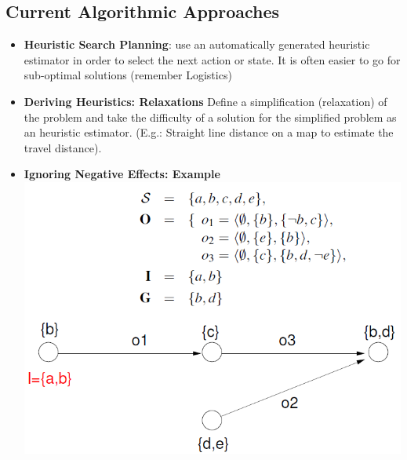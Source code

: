 \documentclass{article}
\begin{document}
\subsection{Current Algorithmic Approaches}
\begin{itemize}
\item \textbf{Heuristic Search Planning}: use an automatically generated heuristic estimator in order to select the next action or state. It is often easier to go for sub-optimal solutions (remember Logistics)
\item \textbf{Deriving Heuristics: Relaxations} Define a simplification (relaxation) of the problem and take the difficulty of a solution for the simplified problem as an heuristic estimator. (E.g.: Straight line distance on a map to estimate the travel distance).\\
\item \textbf{Ignoring Negative Effects: Example}\\
\includegraphics[scale=0.6]{57.png}
\end{itemize}
\end{document}
